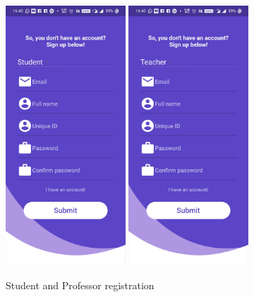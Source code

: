 \documentclass{article}
\begin{document}
\begin{figure}[H]
    \centering
    \includegraphics[width=0.40\textwidth]{Studentregisteration.jpg}
    \includegraphics[width=0.40\textwidth]{ProfRegistration.jpg}
    \caption{Student and Professor registration}
    \label{fig:StudentProfReg}
\end{figure}
\end{document}
